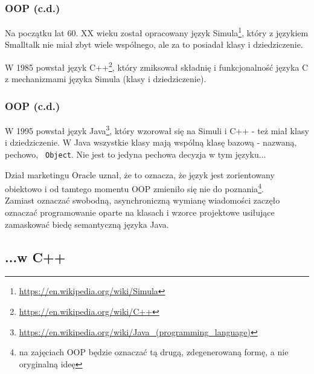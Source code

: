 \documentclass[aspectratio=169]{beamer}
\begin{document}
\begin{frame}
    \frametitle{OOP (c.d.)}

    Na początku lat 60. XX wieku został opracowany język
    Simula\footnote{\url{https://en.wikipedia.org/wiki/Simula}}, który z językiem
    Smalltalk nie miał zbyt wiele wspólnego, ale za to posiadał klasy i
    dziedziczenie.

    \vspace{1em}

    W 1985 powstał język C++\footnote{\url{https://en.wikipedia.org/wiki/C++}},
    który zmiksował składnię i funkcjonalność języka C z mechanizmami języka
    Simula (klasy i dziedziczenie).
\end{frame}

\begin{frame}
    \frametitle{OOP (c.d.)}

    W 1995 powstał język
    Java\footnote{\url{https://en.wikipedia.org/wiki/Java_(programming_language)}},
    który wzorował się na Simuli i C++ - też miał klasy i dziedziczenie.
    W Java wszystkie klasy mają wspólną klasę bazową - nazwaną, pechowo, {\tt
    Object}. Nie jest to jedyna pechowa decyzja w tym języku...

    \vspace{1em}

    Dział marketingu Oracle uznał, że to oznacza, że język jest zorientowany
    obiektowo i od tamtego momentu OOP zmieniło się nie do poznania\footnote{na
    zajęciach OOP będzie oznaczać tą drugą, zdegenerowaną formę, a nie
    oryginalną ideę}.\\Zamiast oznaczać swobodną, asynchroniczną wymianę
    wiadomości zaczęło oznaczać programowanie oparte na klasach i wzorce
    projektowe usiłujące zamaskować biedę semantyczną języka Java.
\end{frame}

\subsection{...w C++}
\end{document}
